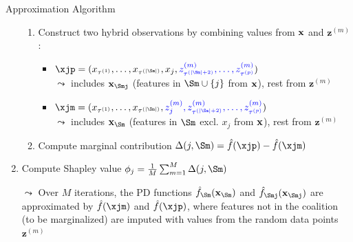\documentclass[10pt,compress,t,notes=noshow, xcolor=table]{beamer}
\begin{document}
\begin{frame}{Approximation Algorithm }
\begin{enumerate}[<+->]
\begin{enumerate}
        \item Construct two hybrid observations by combining values from $\mathbf{x}$ and {\color{blue} $\mathbf{z}^{(m)}$}:
\begin{itemize}
\setlength\itemsep{0.5em}
  \item $
  \xjp = (x_{\tau^{(1)}}, \ldots, x_{\tau^{(|\Sm|)}}, x_j, 
          {\color{blue}z_{\tau^{(|\Sm|+2)}}^{(m)}, \ldots, z_{\tau^{(p)}}^{(m)}})
  $\\
  $\leadsto$ includes $\xv_{\Smj}$ (features in $\Sm \cup \{j\}$ from $\mathbf{x}$), rest from {\color{blue} $\mathbf{z}^{(m)}$}
  
  \item $
  \xjm = (x_{\tau^{(1)}}, \ldots, x_{\tau^{(|\Sm|)}}, 
          {\color{blue}z_j^{(m)}, z_{\tau^{(|\Sm|+2)}}^{(m)}, \ldots, z_{\tau^{(p)}}^{(m)}})
  $\\
   $\leadsto$ includes $\xv_{\Sm}$ (features in $\Sm$ excl. $x_j$ from $\mathbf{x}$), rest from {\color{blue} $\mathbf{z}^{(m)}$}
\end{itemize}
        \item Compute marginal contribution $\Delta(j, \Sm) = \fh(\xjp) - \fh(\xjm)$ %
        \end{enumerate}
        
    \item Compute Shapley value $\phi_j = \frac{1}{M}\sum_{m=1}^M \Delta(j, \Sm)$ %
    \item[$\leadsto$] Over $M$ iterations, the PD functions $\fh_{\Sm}(\xv_{\Sm})$ and $\fh_{\Smj}(\xv_{\Smj})$ are approximated by $\fh(\xjm)$ and $\fh(\xjp)$, where features not in the coalition (to be marginalized) are imputed with values from the random data points {\color{blue} $\mathbf{z}^{(m)}$}
  \end{enumerate}
   

\end{frame}
\end{document}
